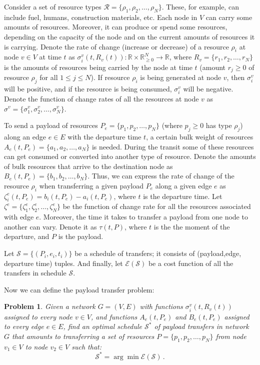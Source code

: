 \documentclass[NIACPhase1B.tex]{subfiles}
\newcommand{\R}{\mathcal{R}\xspace}
\newcommand{\reals}{\mathbb{R}}
\renewcommand{\S}{\mathcal{S}\xspace}
\newcommand{\cost}{\mathcal{E}\xspace}
\newtheorem{problem}{Problem}
\begin{document}
Consider a set of resource types $\R=\{\rho_1,\rho_2,\dots,\rho_N\}$. These, for example, can include fuel, humans, construction materials, etc. Each node in $V$ can carry some amounts of resources. Moreover, it can produce or spend some resources, depending on the capacity of the node and on the current amounts of resources it is carrying. Denote the rate of change (increase or decrease) of a resource $\rho_i$ at node $v\in V$ at time $t$ as $\sigma^v_i(t,R_v(t)):\reals\times\reals_{\ge 0}^N\rightarrow\reals$, where $R_v=\{r_1,r_2,\dots,r_N\}$ is the amounts of resources being carried by the node at time $t$ (amount $r_j\ge 0$ of resource $\rho_j$ for all $1\le j\le N$). If resource $\rho_i$ is being generated at node $v$, then $\sigma^v_i$ will be positive, and if the resource is being consumed, $\sigma^v_i$ will be negative. Denote the function of change rates of all the resources at node $v$ as $\sigma^v=\{\sigma^v_1,\sigma^v_2,\dots,\sigma^v_N\}$.

To send a payload of resources $P_e=\{p_1,p_2,\dots,p_N\}$ (where $p_j\ge 0$ has type $\rho_j$) along an edge $e\in E$ with the departure time $t$, a certain bulk weight of resources $A_e(t,P_e)=\{a_1,a_2,\dots,a_N\}$ is needed. During the transit some of these resources can get consumed or converted into another type of resource. Denote the amounts of bulk resources that arrive to the destination node as $B_e(t,P_e)=\{b_1,b_2,\dots,b_N\}$. Thus, we can express the rate of change of the resource $\rho_i$ when transferring a given payload $P_e$ along a given edge $e$ as $\zeta^e_i(t,P_e)=b_i(t,P_e)-a_i(t,P_e)$, where $t$ is the departure time. Let $\zeta^e=\{\zeta^e_1,\zeta^e_2,\dots,\zeta^e_N\}$ be the function of change rate for all the resources associated with edge $e$. Moreover, the time it takes to transfer a payload from one node to another can vary. Denote it as $\tau(t,P)$, where $t$ is the the moment of the departure, and $P$ is the payload.

Let $\S=\{(P_i,e_i,t_i)\}$ be a schedule of transfers; it consists of (payload,edge, departure time) tuples. And finally, let $\cost(\S)$ be a cost function of all the transfers in schedule $\S$.

Now we can define the payload transfer problem:
\begin{problem}
Given a network $G=(V,E)$ with functions $\sigma^v_i(t,R_v(t))$ assigned to every node $v\in V$, and functions $A_e(t,P_e)$ and $B_e(t,P_e)$ assigned to every edge $e\in E$, find an optimal schedule $\S^{*}$ of payload transfers in network $G$ that amounts to transferring a set of resources $P=\{p_1,p_2,\dots,p_N\}$ from node $v_1\in V$ to node $v_2\in V$ such that:
\[
\S^{*}=\arg\min\cost(\S)\,.
\]
\end{problem}
\end{document}
